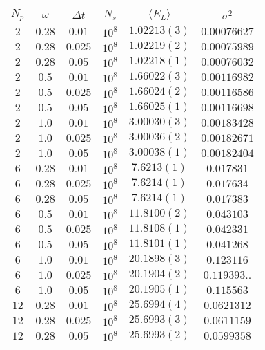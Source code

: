 \documentclass[a4paper,10pt,twocolumn]{article} %
\newcommand{\expec}[1]{\langle{}{#1}\rangle{}}
\begin{document}
\begin{table}%
\begin{center}
\begin{tabular}{|c|c|c|c|c|c|}
\hline
$N_{p}$ & $\omega$ & $\Delta t$ & $N_{s}$ & $\expec{E_L}$ & $\sigma^2$ \\ 
\hline
\hline
 $2$ & $0.28$ & $0.01$  & $10^8$ & $1.02213(3)$ & $0.00076627$ \\ 
 $2$ & $0.28$ & $0.025$ & $10^8$ & $1.02219(2)$ & $0.00075989$ \\ 
 $2$ & $0.28$ & $0.05$  & $10^8$ & $1.02218(1)$ & $0.00076032$ \\ 
\hline
 $2$ & $0.5$ & $0.01$  & $10^8$ & $1.66022(3)$ & $0.00116982$ \\ 
 $2$ & $0.5$ & $0.025$ & $10^8$ & $1.66024(2)$ & $0.00116586$ \\ 
 $2$ & $0.5$ & $0.05$  & $10^8$ & $1.66025(1)$ & $0.00116698$ \\ 
\hline
 $2$ & $1.0$ & $0.01$  & $10^8$ & $3.00030(3)$ & $0.00183428$ \\ 
 $2$ & $1.0$ & $0.025$ & $10^8$ & $3.00036(2)$ & $0.00182671$ \\ 
 $2$ & $1.0$ & $0.05$  & $10^8$ & $3.00038(1)$ & $0.00182404$ \\ 
\hline
\hline
 $6$ & $0.28$ & $0.01$  & $10^8$ & $7.6213(1)$ & $0.017831$ \\ 
 $6$ & $0.28$ & $0.025$ & $10^8$ & $7.6214(1)$ & $0.017634$ \\ 
 $6$ & $0.28$ & $0.05$  & $10^8$ & $7.6214(1)$ & $0.017383$ \\ 
\hline
 $6$ & $0.5$ & $0.01$   & $10^8$ & $11.8100(2)$ & $0.043103$ \\ 
 $6$ & $0.5$ & $0.025$  & $10^8$ & $11.8108(1)$ & $0.042331$ \\ 
 $6$ & $0.5$ & $0.05$   & $10^8$ & $11.8101(1)$ & $0.041268$ \\ 
\hline
 $6$ & $1.0$ & $0.01$  & $10^8$ & $20.1898(3)$ & $0.123116$ \\ 
 $6$ & $1.0$ & $0.025$ & $10^8$ & $20.1904(2)$ & $0.119393..$ \\ 
 $6$ & $1.0$ & $0.05$  & $10^8$ & $20.1905(1)$ & $0.115563$ \\ 
\hline
\hline
 $12$ & $0.28$ & $0.01$  & $10^8$ & $25.6994(4)$ & $0.0621312$ \\ 
 $12$ & $0.28$ & $0.025$ & $10^8$ & $25.6993(3)$ & $0.0611159$ \\ 
 $12$ & $0.28$ & $0.05$  & $10^8$ & $25.6993(2)$ & $0.0599358$ \\ 
\hline

\end{tabular}
\end{center}
\end{table}
\end{document}
